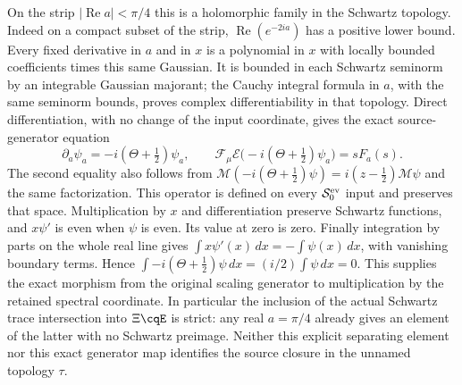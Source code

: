 On the strip $|\operatorname{Re}a|<\pi/4$ this is a holomorphic
family in the Schwartz topology. Indeed on a compact subset of
the strip, $\operatorname{Re}(e^{-2ia})$ has a positive lower
bound. Every fixed derivative in $a$ and in $x$ is a polynomial
in $x$ with locally bounded coefficients times this same Gaussian.
It is bounded in each Schwartz seminorm by an integrable Gaussian
majorant; the Cauchy integral formula in $a$, with the same
seminorm bounds, proves complex differentiability in that topology.
Direct differentiation, with no change of the input coordinate,
gives the exact source-generator equation
\begin{equation}\label{eq:cq-exponential-source-generator}
 \partial_a\psi_a=-i(\Theta+\tfrac12)\psi_a,\qquad
 \mathcal F_\mu\mathcal E\bigl(-i(\Theta+\tfrac12)\psi_a\bigr)
                                      =sF_a(s).
\end{equation}
The second equality also follows from
$\mathcal M(-i(\Theta+\tfrac12)\psi)
=i(z-\tfrac12)\mathcal M\psi$ and the same factorization.
This operator is defined on every $\mathcal S_0^{\rm ev}$ input
and preserves that space. Multiplication by $x$ and differentiation
preserve Schwartz functions, and $x\psi'$ is even when $\psi$ is even.
Its value at zero is zero. Finally integration by parts on the
whole real line gives $\int x\psi'(x)\,dx=-\int\psi(x)\,dx$,
with vanishing boundary terms. Hence
$\int-i(\Theta+\tfrac12)\psi\,dx=(i/2)\int\psi\,dx=0$.
This supplies the exact morphism from the original scaling
generator to multiplication by the retained spectral coordinate.
In particular the inclusion of the actual Schwartz trace
intersection into $\Xi\cqE$ is strict: any real $a=\pi/4$
already gives an element of the latter with no Schwartz preimage.
Neither this explicit separating element nor this exact generator
map identifies the source closure in the unnamed topology $\tau$.

